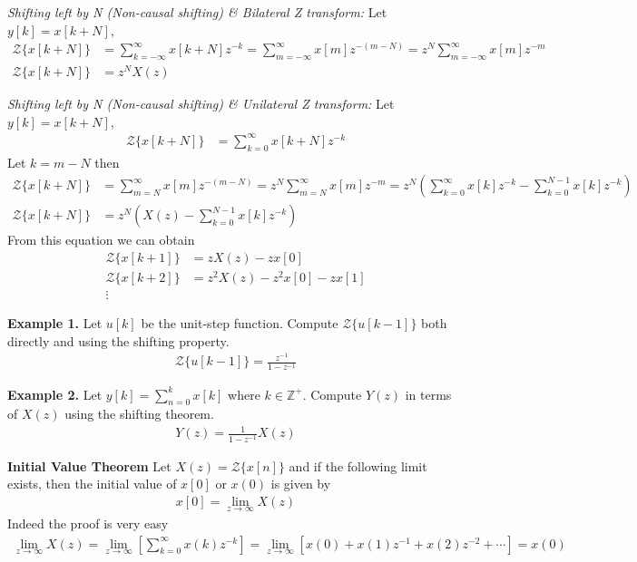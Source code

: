 \documentclass[twoside]{article}
\begin{document}
\textit{Shifting left by N (Non-causal shifting) \& Bilateral Z
  transform:}  Let $y[k] = x[k + N]$,
%
\begin{align*}
\mathcal{Z} \lbrace x[k+N]\rbrace &= \sum\limits_{k=-\infty}^{\infty}
  x[k +N] z^{-k} = \sum\limits_{m=-\infty}^{\infty} x[m] z^{-(m-N)} 
= z^N \sum\limits_{m=-\infty}^{\infty} x[m] z^{-m} 
\\
\mathcal{Z} \lbrace x[k+N]\rbrace &= z^N X(z)
\end{align*}

\textit{Shifting left by N (Non-causal shifting) \& Unilateral Z
  transform:}  Let $y[k] = x[k + N]$,
%
\begin{align*}
\mathcal{Z} \lbrace x[k+N]\rbrace &= \sum\limits_{k=0}^{\infty}
  x[k + N] z^{-k} 
\end{align*}
%
Let $k = m - N$ then 
%
\begin{align*}
\mathcal{Z} \lbrace x[k+N]\rbrace &= \sum\limits_{m=N}^{\infty}
  x[m] z^{-(m-N)} = z^N \sum\limits_{m=N}^{\infty}
  x[m] z^{-m} = z^N \left( \sum\limits_{k=0}^{\infty}
  x[k] z^{-k} - \sum\limits_{k=0}^{N-1} x[k] z^{-k} \right)
\\ 
\mathcal{Z} \lbrace x[k+N]\rbrace &= z^N \left( X(z) -
                                    \sum\limits_{k=0}^{N-1} x[k]
                                    z^{-k} \right)
\end{align*}
%
From this equation we can obtain
\begin{align*}
\mathcal{Z} \lbrace x[k+1]\rbrace &= z X(z) - z x[0]
\\
\mathcal{Z} \lbrace x[k+2]\rbrace &= z^2 X(z) - z^2 x[0] - z x[1]
\\
\vdots &
\end{align*}

\textbf{Example 1.} Let $u[k]$ be the unit-step function. Compute
$\mathcal{Z} \lbrace u[k-1] \rbrace$ both directly and using the shifting property.
%
\begin{align*}
  \mathcal{Z} \lbrace u[k-1] \rbrace = \frac{z^{-1}}{1 - z^{-1}}
\end{align*}
%


\textbf{Example 2.} Let $y[k] = \sum\limits_{n=0}^{k} x[k]$ where $k
\in \mathbb{Z}^+$. Compute $Y(z)$ in terms of $X(z)$ using the
shifting theorem.
%
\begin{align*}
 Y(z) = \frac{1}{1 - z^{-1}} X(z)
\end{align*}
%

\textbf{Initial Value Theorem}
%
Let $X(z) = \mathcal{Z} \lbrace x[n] \rbrace$ and if the following limit exists, 
then the initial value of $x[0]$ or $x(0)$ is given by
%
\begin{align*}
x[0] = \lim_{z \to \infty} X(z)
\end{align*}
%
Indeed the proof is very easy
%
\begin{align*}
\lim_{z \to \infty} X(z) = \lim_{z \to \infty} \left[
  \sum\limits_{k=0}^{\infty} x(k) z^{-k} \right] = \lim_{z \to \infty} \left[ x(0) + x(1) z^{-1} +
  x(2) z^{-2} + \cdots \right]
 = x(0)
\end{align*}
%
\end{document}
